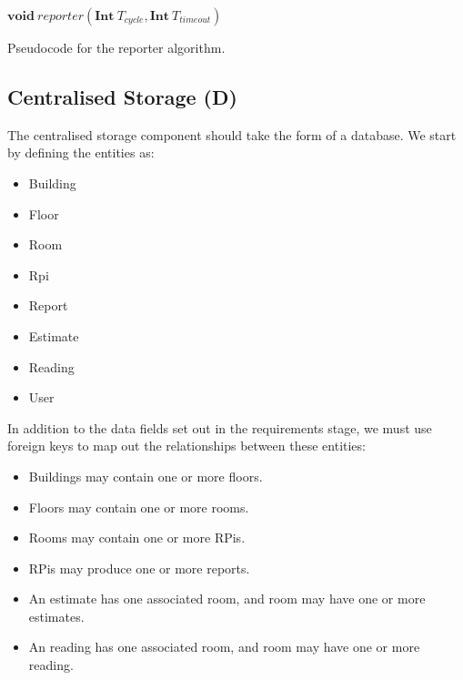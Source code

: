 \documentclass{l4proj}
\begin{document}
\begin{algorithm}
\DontPrintSemicolon
\nl $\textbf{void}~reporter(\textbf{Int}~T_{cycle}, \textbf{Int}~T_{timeout})$ \;
\nl {}
\;
\caption{Pseudocode for the reporter algorithm.}
\label{RPA}
\end{algorithm}

\subsection{Centralised Storage (D)}
The centralised storage component should take the form of a database. We start by defining the entities as:

\begin{itemize}	
  \item Building
  \item Floor
  \item Room
  \item Rpi
  \item Report
  \item Estimate
  \item Reading
  \item User
\end{itemize}

In addition to the data fields set out in the requirements stage, we must use foreign keys to map out the relationships between these entities:
\begin{itemize}
  \item Buildings may contain one or more floors.
  \item Floors may contain one or more rooms.	
  \item Rooms may contain one or more RPis.
  \item RPis may produce one or more reports.
  \item An estimate has one associated room, and room may have one or more estimates.
  \item An reading has one associated room, and room may have one or more reading.
\end{itemize}
\end{document}
